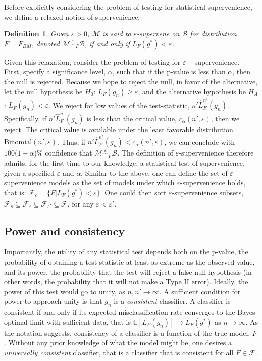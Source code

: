 \documentclass{article}
\newcommand{\conv}{\rightarrow}
\newcommand{\mB}{\mathcal{B}}
\newcommand{\mM}{\mathcal{M}}
\newcommand{\EE}{\mathbb{E}}           %
\newcommand{\eps}{\varepsilon}
\providecommand{\mc}[1]{\mathcal{#1}}
\newcommand{\hL}{\widehat{L}}
\newcommand{\MeB}{\mM \overset{\varepsilon}{{\sim}}_F \mB}
\newtheorem{defi}{Definition}
\begin{document}
Before explicitly considering the problem of testing for statistical supervenience, we define a relaxed notion of supervenience:
\begin{defi}
\label{def2}
Given $\varepsilon > 0$, $\mM$ is said to $\varepsilon$-\textit{supervene} on $\mB$ for distribution $F=F_{BM}$, denoted $\MeB$, if and only if $L_{F}(g^*) < \varepsilon$.
\end{defi}

Given this relaxation, consider the problem of testing for $\eps-$supervenience.  First, specify a significance level, $\alpha$, such that if the p-value is less than $\alpha$, then the null is rejected.  Because we hope to reject the null, in favor of the alternative, let the null hypothesis be $H_0$: $L_{F}(g_n) \geq \eps$, and the alternative hypothesis be $H_A$: $L_{F}(g_n) < \eps$.  We reject for low values of the test-statistic, $n' \hL^{n'}_{F}(g_n)$.  Specifically, if $n' \hL^{n'}_{F}(g_n)$ is less than the critical value,  $c_{\alpha}(n',\varepsilon)$, then we reject.  The critical value is available under the least favorable distribution $\text{Binomial}(n',\varepsilon)$.  Thus, if $n' \hL^{n'}_{F}(g_n) < c_{\alpha}(n',\varepsilon)$, we can conclude with $100(1-\alpha$)\% confidence that $\MeB$.  The definition of $\eps$-supervenience therefore admits, for the first time to our knowledge, a statistical test of supervenience, given a specified $\eps$ and $\alpha$. Similar to the above, one can define the set of $\eps$-supervenience models as the set of models under which $\eps$-supervenience holds, that is: $\mc{F}_\eps = \{F | L_F(g^*)< \eps\}$.  One could then sort  $\eps$-supervenience subsets,  $\mc{F}_s \subseteq \mc{F}_{\eps} \subseteq \mc{F}_{\eps'} \subseteq \mc{F}$, for any $\eps < \eps'$.


\subsection{Power and consistency} %
\label{ssub:power_and_consistency}


Importantly, the utility of any statistical test depends both on the p-value, the probability of obtaining a test statistic at least as extreme as the observed value, and its power, the probability that the test will reject a false null hypothesis (in other words, the probability that it will not make a Type II error).  Ideally, the power of this test would go to unity, as $n,n' \rightarrow \infty$.  A sufficient condition for power to approach unity is that $g_n$ is a \emph{consistent} classifier.  A classifier is consistent if and only if its expected misclassification rate converges to the Bayes optimal limit with sufficient data, that is $\EE[L_F(g_n)] \conv L_F(g^*)$ as $n\conv \infty$. As the notation suggests, consistency of a classifier is a function of the true model, $F$.  Without any prior knowledge of what the model might be, one desires a \emph{universally consistent} classifier, that is a classifier that is consistent for all $F \in \mc{F}$.  
\end{document}
